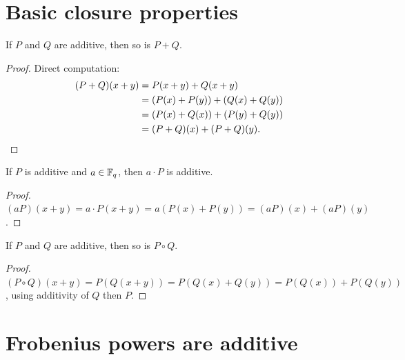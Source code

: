 \section{Basic closure properties}
\label{sec:additive_closure}

\begin{proposition}
  \label{prop:additive_add}
  \leanok
  If $P$ and $Q$ are additive, then so is $P + Q$.
\end{proposition}

\begin{proof}
  \leanok
  Direct computation:
  \begin{align*}
    (P+Q)(x+y) &= P(x+y) + Q(x+y) \\
               &= (P(x)+P(y)) + (Q(x)+Q(y)) \\
               &= (P(x)+Q(x)) + (P(y)+Q(y)) \\
               &= (P+Q)(x) + (P+Q)(y). \qedhere
  \end{align*}
\end{proof}

\begin{proposition}
  \label{prop:additive_smul}
  \leanok
  If $P$ is additive and $a \in \mathbb{F}_q$, then $a \cdot P$ is additive.
\end{proposition}

\begin{proof}
  \leanok
  $(aP)(x+y) = a \cdot P(x+y) = a(P(x)+P(y)) = (aP)(x) + (aP)(y)$.
\end{proof}

\begin{proposition}
  \label{prop:additive_comp}
  \leanok
  If $P$ and $Q$ are additive, then so is $P \circ Q$.
\end{proposition}

\begin{proof}
  \leanok
  $(P \circ Q)(x + y) = P(Q(x+y)) = P(Q(x)+Q(y)) = P(Q(x)) + P(Q(y))$,
  using additivity of $Q$ then $P$.
\end{proof}

\section{Frobenius powers are additive}
\label{sec:frobenius_additive}

